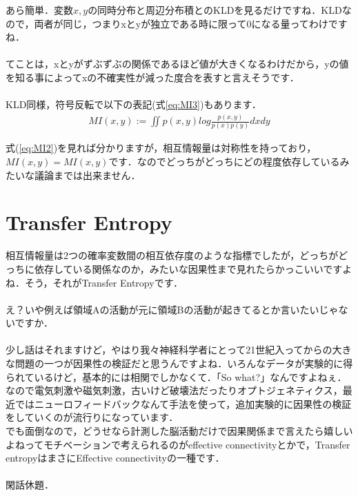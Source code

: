 \documentclass[11pt,a4paper,uplatex]{ujreport}
\begin{document}
あら簡単．$変数x,y$の同時分布と周辺分布積とのKLDを見るだけですね．KLDなので，両者が同じ，つまりxとyが独立である時に限って0になる量ってわけですね．\\
\\

てことは，xとyがずぶずぶの関係であるほど値が大きくなるわけだから，yの値を知る事によってxの不確実性が減った度合を表すと言えそうです\cite{prml}．\\
\\

KLD同様，符号反転で以下の表記(式\ref{eq:MI3})もあります．
\begin{eqnarray}
\label{eq:MI3}
  MI(x,y) := \iint p(x,y) log \frac{p(x,y)}{p(x)p(y)} dxdy
\end{eqnarray}

式(\ref{eq:MI2})を見れば分かりますが，相互情報量は対称性を持っており，$MI(x,y) = MI(x,y)$です．なのでどっちがどっちにどの程度依存しているみたいな議論までは出来ません．
\section{Transfer Entropy}
相互情報量は2つの確率変数間の相互依存度のような指標でしたが，どっちがどっちに依存している関係なのか，みたいな因果性まで見れたらかっこいいですよね．そう，それがTransfer Entropyです．\\
\\

え？いや例えば領域Aの活動が元に領域Bの活動が起きてるとか言いたいじゃないですか．\\
\\

少し話はそれますけど，やはり我々神経科学者にとって21世紀入ってからの大きな問題の一つが因果性の検証だと思うんですよね．いろんなデータが実験的に得られているけど，基本的には相関でしかなくて．「So what?」なんですよねぇ．なので電気刺激や磁気刺激，古いけど破壊法だったりオプトジェネティクス，最近ではニューロフィードバックなんて手法を使って，追加実験的に因果性の検証をしていくのが流行りになっています．\\

でも面倒なので，どうせなら計測した脳活動だけで因果関係まで言えたら嬉しいよねってモチベーションで考えられるのがeffective connectivityとかで，Transfer entropyはまさにEffective connectivityの一種です．\\
\\

閑話休題．\\
\\
\end{document}

